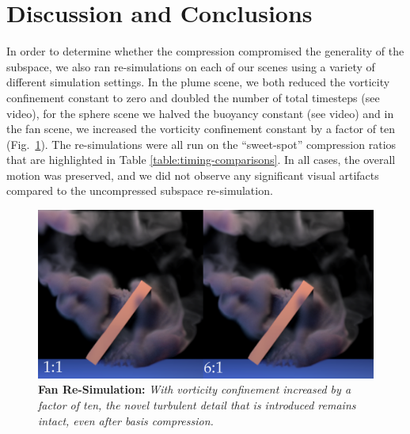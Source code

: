 
\section{Discussion and Conclusions}

In order to determine whether the compression compromised the generality of the subspace, we also ran re-simulations \cite{Kim2013} on each of our scenes using a variety of different simulation settings. In the plume scene, we both reduced the vorticity confinement constant to zero and doubled the number of total timesteps (see video), for the sphere scene we halved the buoyancy constant (see video) and in the fan scene, we increased the vorticity confinement constant by a factor of ten (Fig.~\ref{fig:fanResim}). The re-simulations were all run on the ``sweet-spot'' compression ratios that are highlighted in Table \ref{table:timing-comparisons}. In all cases, the overall motion was preserved, and we did not observe any significant visual artifacts compared to the uncompressed subspace re-simulation.

\begin{figure}[h]
\includegraphics[width=\columnwidth]{chap4/figures/paddle_resim.png}
\vspace*{-1em}
\caption{\textbf{Fan Re-Simulation:} {\em With vorticity confinement increased by a factor of ten, the novel turbulent detail that is introduced remains intact, even after basis compression.}}
\label{fig:fanResim}
\end{figure}


